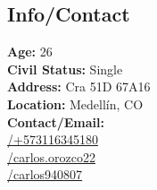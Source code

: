 \documentclass[american]{cv-class}
\begin{document}
\begin{aside}
	\section{Info/Contact}
	\textbf{Age:} 26 \\
	\textbf{Civil Status:} Single \\
	\textbf{Address:} Cra 51D 67A16 \\
	\textbf{Location:} Medellín, CO \\
	\textbf{Contact/Email:}\\ \href{https://api.whatsapp.com/send?phone=573116345180}{/+573116345180}\\
	\href{https://join.skype.com/invite/GVNxPbWtJxdc}{/carlos.orozco22}\\
	\href{mailto:carlos940807@gmail.com}{/carlos940807}
	~

\end{aside}
\end{document}
